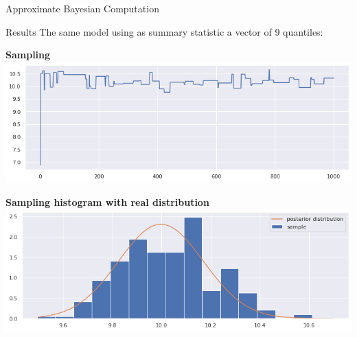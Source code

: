 \documentclass{beamer}
\begin{document}
\begin{section}{Approximate Bayesian Computation}
\begin{frame}{Results}
The same model using as summary statistic a vector of 9 quantiles:
\begin{center}
	\begin{minipage}{0.63\textwidth}
		\begin{center}
			{\scriptsize \textbf{Sampling}}
			\includegraphics[width=\textwidth]{ABC_graphs/ABC_S1_1000iter}
		\end{center}
	\end{minipage}
	
	\vspace{0.2cm}
	
	\begin{minipage}{0.63\textwidth}
		\begin{center}
			{\scriptsize \textbf{Sampling histogram with real distribution}}
			\includegraphics[width=\textwidth]{ABC_graphs/ABC_S1}
		\end{center}
	\end{minipage}
\end{center}
\end{frame}


\end{section}
\end{document}

